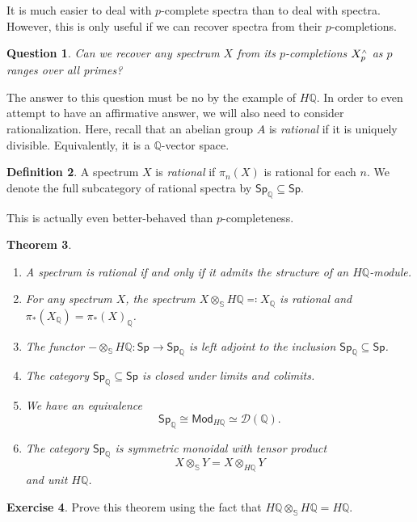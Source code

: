 \documentclass[10pt]{amsart}
\newtheorem{thm}{Theorem}[subsection]
\newtheorem{quest}[thm]{Question}
\theoremstyle{definition}
\newtheorem{defn}[thm]{Definition}
\newtheorem{exer}[thm]{Exercise}
\theoremstyle{remark}
\theoremstyle{plain}
\theoremstyle{definition}
\theoremstyle{remark}
\newcommand{\Q}{\mathbb{Q}}
\newcommand{\bS}{\mathbb{S}}
\newcommand{\mc}[1]{\mathcal{#1}}
\newcommand{\ms}[1]{\mathsf{#1}}
\newcommand{\1}{\mathbf{1}}
\newcommand{\2}{\mathbf{2}}
\newcommand{\3}{\mathbf{3}}
\newcommand{\sw}{\mathsmaller{\wedge}}
\begin{document}
It is much easier to deal with $p$-complete spectra than to deal with spectra. However, this is only useful if we can recover spectra from their $p$-completions.

\begin{quest}
    Can we recover any spectrum $X$ from its $p$-completions $X_p^{\sw}$ as $p$ ranges over all primes?
\end{quest}

The answer to this question must be no by the example of $H\Q$. In order to even attempt to have an affirmative answer, we will also need to consider rationalization. Here, recall that an abelian group $A$ is \textit{rational} if it is uniquely divisible. Equivalently, it is a $\Q$-vector space.

\begin{defn}
    A spectrum $X$ is \textit{rational} if $\pi_n (X)$ is rational for each $n$. We denote the full subcategory of rational spectra by $\ms{Sp}_{\Q} \subseteq \ms{Sp}$.
\end{defn}

This is actually even better-behaved than $p$-completeness.
\begin{thm}\leavevmode
    \begin{enumerate}
        \item A spectrum is rational if and only if it admits the structure of an $H\Q$-module.
        \item For any spectrum $X$, the spectrum $X \otimes_{\bS} H\Q \eqqcolon X_{\Q}$ is rational and $\pi_*(X_{\Q}) = \pi_*(X)_{\Q}$. 
        \item The functor $-\otimes_{\bS} H\Q \colon \ms{Sp} \to \ms{Sp}_{\Q}$ is left adjoint to the inclusion $\ms{Sp}_{\Q} \subseteq \ms{Sp}$.
        \item The category $\ms{Sp}_{\Q} \subseteq \ms{Sp}$ is closed under limits and colimits.
        \item We have an equivalence
        \[ \ms{Sp}_{\Q} \cong \ms{Mod}_{H\Q} \simeq \mc{D}(\Q). \]
        \item The category $\ms{Sp}_{\Q}$ is symmetric monoidal with tensor product
        \[ X \otimes_{\bS} Y = X \otimes_{H\Q} Y \]
        and unit $H\Q$.
    \end{enumerate}
\end{thm}

\begin{exer}
    Prove this theorem using the fact that $H\Q \otimes_{\bS} H\Q = H\Q$.
\end{exer}
\end{document}
